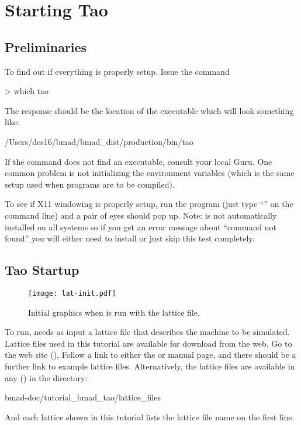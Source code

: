 \documentclass{hitec}     %
\newcommand{\Section}[1]{\section{#1}\vspace*{-1ex}}
\begin{document}
\newpage

\Section{Starting Tao}
\label{s:start}

\subsection{Preliminaries}

To find out if everything is properly setup. Issue the command
\begin{code}
> which tao
\end{code}
The response should be the location of the \tao executable which will look something like:
\begin{code}
/Users/dcs16/bmad/bmad_dist/production/bin/tao
\end{code}
If the  command does not find an executable, consult your local \bmad Guru. One common
problem is not initializing the \bmad environment variables (which is the same setup used when
programs are to be compiled).

To see if X11 windowing is properly setup, run the  program (just type ``'' on
the command line) and a pair of eyes should pop up. Note:  is not automatically installed
on all systems so if you get an error message about ``command not found'' you will either need to
install  or just skip this test completely.

\subsection{Tao Startup}
\label{s:tao.run}

\begin{figure}[tb]
  \centering
  \texttt{[image: lat-init.pdf]}
  \caption{Initial graphics when \tao is run with the  lattice file.}
  \label{f:init.graph}
\end{figure}

To run, \tao needs as input a \bmad lattice file that describes the machine to be simulated.
Lattice files used in this tutorial are available for download from the web. Go to the \bmad web
site (), Follow a link to either the \bmad or \tao manual page, and there should
be a further link to example lattice files. Alternatively, the lattice files are available in any
 () in the directory:
\begin{code}
bmad-doc/tutorial_bmad_tao/lattice_files
\end{code}
And each lattice shown in this tutorial lists the lattice file name on the first line.
\end{document}
